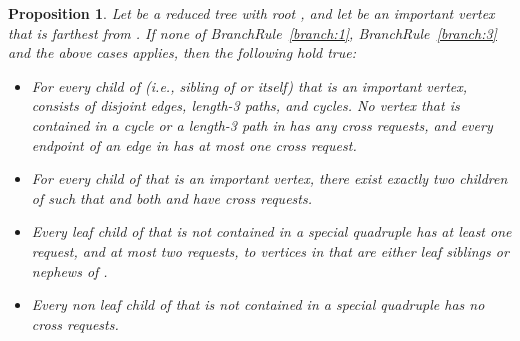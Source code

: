 \documentclass[11pt]{article}
\newtheorem{proposition}[theorem]{Proposition}
\begin{document}
\begin{proposition}
\label{prop:properties}
Let  be a reduced tree with root , and let  be an important vertex that is farthest from . If none of BranchRule~\ref{branch:1}, BranchRule~\ref{branch:3} and the above cases applies, then the following hold true:

\begin{itemize}

\item[(i)] For every child  of  (i.e., sibling of  or  itself) that is an important vertex,  consists of disjoint edges, length-3 paths, and cycles. No vertex that is contained in a cycle or a length-3 path in  has any cross requests, and every endpoint of an edge in  has at most one cross request.

\item[(ii)] For every child  of  that is an important vertex, there exist exactly two children  of  such that  and both  and  have cross requests.

\item[(iii)] Every leaf child   of  that is not contained in a special quadruple has at least one request, and at most two requests, to vertices in  that are either leaf siblings or nephews of .


\item[(iv)] Every non leaf child of  that is not contained in a special quadruple has no cross requests.
\end{itemize}
\end{proposition}
\end{document}
